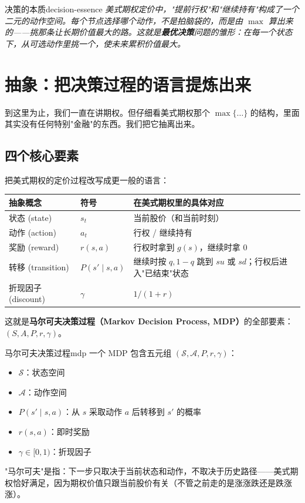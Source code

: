 \documentclass[11pt,a4paper]{ctexart}
\newcommand{\1}{\mathbf{1}}
\begin{document}
\begin{idea}{决策的本质}{decision-essence}
\itshape 美式期权定价中，"提前行权"和"继续持有"构成了一个二元的动作空间。每个节点选择哪个动作，不是拍脑袋的，而是由 $\max$ 算出来的——挑那条让长期价值最大的路。这就是\textbf{最优决策}问题的雏形：在每一个状态下，从可选动作里挑一个，使未来累积价值最大。
\end{idea}

\section{抽象：把决策过程的语言提炼出来}

到这里为止，我们一直在讲期权。但仔细看美式期权那个 $\max\{\ldots\}$ 的结构，里面其实没有任何特别"金融"的东西。我们把它抽离出来。

\subsection{四个核心要素}

把美式期权的定价过程改写成更一般的语言：

\medskip
\noindent
\begin{tabular}{@{}p{3.5cm}p{4.5cm}p{6.5cm}@{}}
\toprule
\textbf{抽象概念} & \textbf{符号} & \textbf{在美式期权里的具体对应} \\
\midrule
状态 (state) & $s_t$ & 当前股价（和当前时刻）\\
动作 (action) & $a_t$ & 行权 / 继续持有 \\
奖励 (reward) & $r(s, a)$ & 行权时拿到 $g(s)$，继续时拿 0 \\
转移 (transition) & $P(s' \mid s, a)$ & 继续时按 $q, 1-q$ 跳到 $su$ 或 $sd$；行权后进入"已结束"状态 \\
折现因子 (discount) & $\gamma$ & $1/(1+r)$ \\
\bottomrule
\end{tabular}
\medskip

这就是\textbf{马尔可夫决策过程（Markov Decision Process, MDP）}的全部要素：$(S, A, P, r, \gamma)$。

\begin{defn}{马尔可夫决策过程}{mdp}
一个 MDP 包含五元组 $(\mathcal{S}, \mathcal{A}, P, r, \gamma)$：
\begin{itemize}
    \item $\mathcal{S}$：状态空间
    \item $\mathcal{A}$：动作空间
    \item $P(s'\mid s,a)$：从 $s$ 采取动作 $a$ 后转移到 $s'$ 的概率
    \item $r(s,a)$：即时奖励
    \item $\gamma \in [0,1)$：折现因子
\end{itemize}
"马尔可夫"是指：下一步只取决于当前状态和动作，不取决于历史路径——美式期权恰好满足，因为期权价值只跟当前股价有关（不管之前走的是涨涨跌还是跌涨涨）。
\end{defn}
\end{document}

